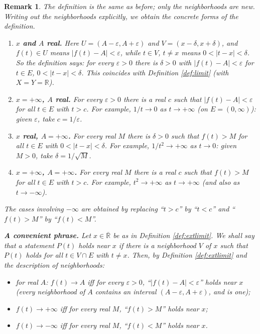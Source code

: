 \documentclass{article}
\theoremstyle{mythm}
\newtheorem{remark}[theorem]{Remark}
\begin{document}
\begin{remark}\label{rem:extconcrete}
The definition is the same as before; only the neighborhoods are new. Writing out the neighborhoods explicitly, we obtain the concrete forms of the definition.
\begin{enumerate}
    \item \textbf{$x$ and $A$ real.} Here $U = (A - \varepsilon, A + \varepsilon)$ and $V = (x - \delta, x + \delta)$, and $f(t) \in U$ means $|f(t) - A| < \varepsilon$, while $t \in V$, $t \neq x$ means $0 < |t - x| < \delta$. So the definition says: for every $\varepsilon > 0$ there is $\delta > 0$ with $|f(t) - A| < \varepsilon$ for $t \in E$, $0 < |t - x| < \delta$. This coincides with Definition \ref{def:limit} (with $X = Y = \mathbb{R}$).
    \item \textbf{$x = +\infty$, $A$ real.} For every $\varepsilon > 0$ there is a real $c$ such that $|f(t) - A| < \varepsilon$ for all $t \in E$ with $t > c$. For example, $1/t \to 0$ as $t \to +\infty$ (on $E = (0,\infty)$): given $\varepsilon$, take $c = 1/\varepsilon$.
    \item \textbf{$x$ real, $A = +\infty$.} For every real $M$ there is $\delta > 0$ such that $f(t) > M$ for all $t \in E$ with $0 < |t - x| < \delta$. For example, $1/t^2 \to +\infty$ as $t \to 0$: given $M > 0$, take $\delta = 1/\sqrt{M}$.
    \item \textbf{$x = +\infty$, $A = +\infty$.} For every real $M$ there is a real $c$ such that $f(t) > M$ for all $t \in E$ with $t > c$. For example, $t^2 \to +\infty$ as $t \to +\infty$ (and also as $t \to -\infty$).
\end{enumerate}
The cases involving $-\infty$ are obtained by replacing ``$t > c$'' by ``$t < c$'' and ``$f(t) > M$'' by ``$f(t) < M$''.

\textbf{A convenient phrase.} Let $x \in \overline{\mathbb{R}}$ be as in Definition \ref{def:extlimit}. We shall say that a statement $P(t)$ holds \textit{near $x$} if there is a neighborhood $V$ of $x$ such that $P(t)$ holds for all $t \in V \cap E$ with $t \neq x$. Then, by Definition \ref{def:extlimit} and the description of neighborhoods:
\begin{itemize}
    \item for real $A$: $f(t) \to A$ iff for every $\varepsilon > 0$, ``$|f(t) - A| < \varepsilon$'' holds near $x$ (every neighborhood of $A$ contains an interval $(A-\varepsilon, A+\varepsilon)$, and is one);
    \item $f(t) \to +\infty$ iff for every real $M$, ``$f(t) > M$'' holds near $x$;
    \item $f(t) \to -\infty$ iff for every real $M$, ``$f(t) < M$'' holds near $x$.
\end{itemize}
\end{remark}
\end{document}
